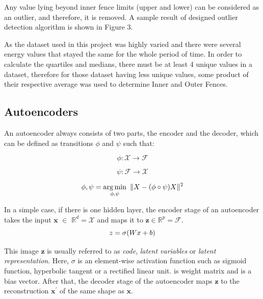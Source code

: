 \documentclass[conference]{IEEEtran}
\DeclareMathOperator*{\argmin}{arg\,min}
\begin{document}
Any value lying beyond inner fence limits (upper and lower) can be considered as an 	outlier, and therefore, it is removed. A sample result of designed outlier detection 	algorithm is shown in Figure 3.

As the dataset used in this project was highly varied and there were several energy values that stayed the same for the whole period of time. In order to calculate the quartiles and medians, there must be at least 4 unique values in a dataset, therefore for those dataset having less unique values, some product of their respective average was used to determine Inner and Outer Fences. 

\subsection{\label{sec:level1}	Autoencoders}

An autoencoder always consists of two parts, the encoder and the decoder, which can be defined 	as transitions $\phi$ and $\psi$ such that:

\begin{equation}
\phi : \mathcal{X} \to \mathcal{F}
\end{equation}

\begin{equation}
\psi : \mathcal{F} \to \mathcal{X}
\end{equation}

\begin{equation}
\phi , \psi = 
\argmin_{\phi,\psi}\ \| X - (\phi \circ \psi)X  \|^2\\
\end{equation}

In a simple case, if there is one hidden layer, the encoder stage of an autoencoder takes the input $\mathbf{x}$ $\in$ $\mathbb{R}^d = \mathcal{X}$ and maps it to $\mathbf{z} \in \mathbb{R}^p =\mathcal{F}  $.
\begin{equation}
\boldmath{z} = \sigma(Wx+b)
\end{equation}

This image $\mathbf {z} $  is usually referred to as \textit{code}, \textit{latent variables} or \textit{latent representation}. Here, $\sigma$ is an element-wise activation function such as sigmoid function, hyperbolic tangent or a rectified linear unit.  is weight matrix and  is a bias vector. After that, the decoder stage of the autoencoder maps $\mathbf{z}$ to the reconstruction $\mathbf{x^{\prime}}$ of the same shape as $\mathbf{x}$.
\end{document}
